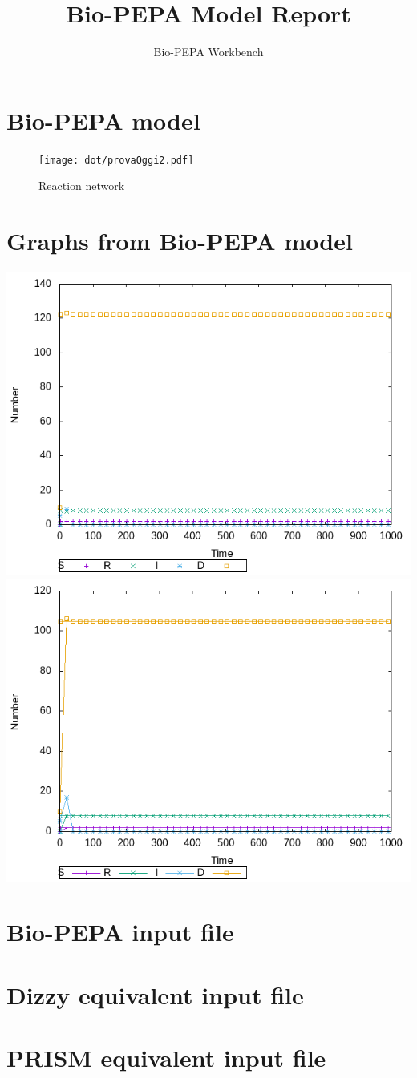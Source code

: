 \documentclass{llncs}
\title{Bio-PEPA Model Report}
\author{Bio-PEPA Workbench}
\institute{\today}
\begin{document}
\maketitle
\section{Bio-PEPA model}

\begin{figure}[htbp]
\begin{center}
\texttt{[image: dot/provaOggi2.pdf]}
\caption{Reaction network}
\end{center}
\end{figure}
\newpage
\section{Graphs from Bio-PEPA model}
\includegraphics[scale=0.5]{png/provaOggi2001_dizzy_results_0}
\hfill
\includegraphics[scale=0.5]{png/provaOggi2001_dizzy_results_1}
\appendix
\newpage
\section{Bio-PEPA input file}

\newpage
\section{Dizzy equivalent input file}

\newpage
\section{PRISM equivalent input file}

\end{document}
